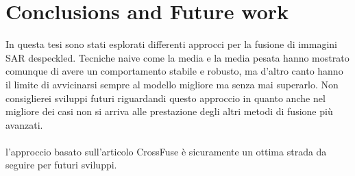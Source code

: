 
\chapter{Conclusions and Future work}
In questa tesi sono stati esplorati differenti approcci per la fusione di immagini SAR despeckled. 
Tecniche naive come la media e la media pesata hanno mostrato comunque di avere un comportamento stabile e robusto, 
ma d'altro canto hanno il limite di avvicinarsi sempre al modello migliore ma senza mai superarlo.
Non consiglierei sviluppi futuri riguardandi questo approccio in quanto anche nel migliore dei casi non 
si arriva alle prestazione degli altri metodi di fusione più avanzati.
\\\\
l'approccio basato sull'articolo CrossFuse è sicuramente un ottima strada da seguire per futuri sviluppi.
